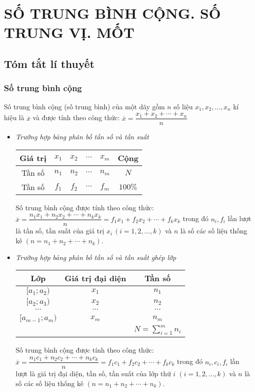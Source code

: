 \section{SỐ TRUNG BÌNH CỘNG. SỐ TRUNG VỊ. MỐT}
\subsection{Tóm tắt lí thuyết}
\subsubsection{Số trung bình cộng}
\begin{dn}
	Số trung bình cộng (số trung bình) của một dãy gồm $n$ số liệu $x_1,x_2,...,x_n$ kí hiệu là $\overline{x}$ và được tính theo công thức: $\overline{x}=\dfrac{x_1+x_2+\cdots+x_n}{n}$
\begin{itemize}
	\item \textit{Trường hợp bảng phân bố tần số và tần suất}
\begin{center}
\begin{tabular}{|c|c|c|c|c|c|}
 \hline
Giá trị & $x_1$ &$x_2$ & $\cdots$ & $x_m$&Cộng   \\
\hline
Tần số &$n_1$ &$n_2$ & $\cdots$ & $n_m$&$N$   \\
\hline	
Tần số &$f_1$ &$f_2$ & $\cdots$ & $f_m$&$100\%$   \\
\hline	
\end{tabular}
\end{center}
	Số trung bình cộng được tính theo công thức:\\
		$\overline{x}=\dfrac{n_1x_1+n_2x_2+\cdots+n_kx_k}{n}=f_1x_1+f_2x_2+\cdots+f_kx_k$
		trong đó $n_i,f_i$ lần lượt là tần số, tần suất của giá trị $x_i\,\left(i=1,2,...,k\right)$ và $n$ là số các số liệu thống kê $\left(n=n_1+n_2+\cdots+n_k\right)$.
		\item \textit{Trường hợp bảng phân bố tần số và tần suất ghép lớp}
\begin{center}
\begin{tabular}{|c|c|c|}
\hline
Lớp & Giá trị đại diện & Tần số   \\
\hline
$[a_1;a_2)$& $x_1$ &   $n_1$ \\
\hline	
$[a_2;a_3)$& $x_2$ &   $n_2$ \\
\hline	
$\cdots$& $\cdots$ &  $\cdots$ \\
\hline	
$[a_{m-1};a_{m})$ & $x_m$ &  $n_m$\\
\hline	
& &   $N=\sum_{i=1}^mn_i$ \\
\hline	
\end{tabular}
\end{center}
		Số trung bình cộng được tính theo công thức:\\
		$\overline{x}=\dfrac{n_1c_1+n_2c_2+\cdots+n_kc_k}{n}=f_1c_1+f_2c_2+\cdots+f_kc_k$
		trong đó $n_i,c_i,f_i$ lần lượt là giá trị đại diện, tần số, tần suất của lớp thứ $i$ $\left(i=1,2,...,k\right)$ và $n$ là số các số liệu thống kê $\left(n=n_1+n_2+\cdots+n_k\right)$.
\end{itemize}
\end{dn}
